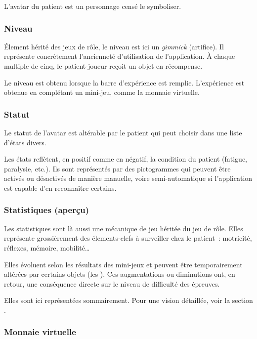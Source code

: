 \documentclass[a4paper,12pt,francais]{article}
\begin{document}
L'avatar du patient est un personnage censé le symboliser.

\subsubsection{Niveau}

Élement hérité des jeux de rôle, le niveau est ici un \emph{gimmick} (artifice). Il représente concrètement l'ancienneté d'utilisation de l'application. À chaque multiple de cinq, le patient-joueur reçoit un objet en récompense.

Le niveau est obtenu lorsque la barre d'expérience est remplie. L'expérience est obtenue en complétant un mini-jeu, comme la monnaie virtuelle.

\subsubsection{Statut}

Le statut de l'avatar est altérable par le patient qui peut choisir dans une liste d'états divers.

Les états reflètent, en positif comme en négatif, la condition du patient (fatigue, paralysie, etc.). Ils sont représentés par des pictogrammes qui peuvent être activés ou désactivés de manière manuelle, voire semi-automatique si l'application est capable d'en reconnaître certains.

\subsubsection{Statistiques (aperçu)}

Les statistiques sont là aussi une mécanique de jeu héritée du jeu de rôle. Elles représente grossièrement des élements-clefs à surveiller chez le patient~: motricité, réflexes, mémoire, mobilité\dots

Elles évoluent selon les résultats des mini-jeux et peuvent être temporairement altérées par certains objets (les ). Ces augmentations ou diminutions ont, en retour, une conséquence directe sur le niveau de difficulté des épreuves.

Elles sont ici représentées sommairement. Pour une vision détaillée, voir la section .

\subsubsection{Monnaie virtuelle}
\end{document}
